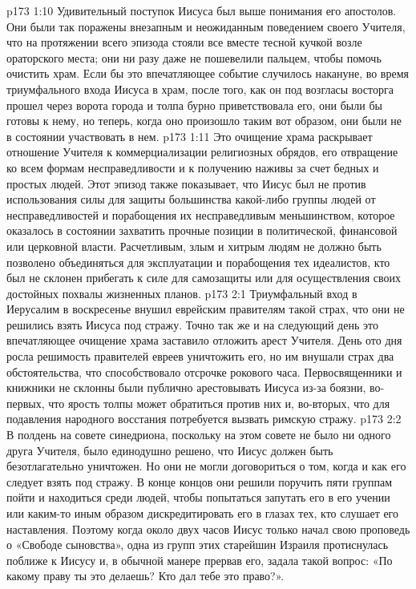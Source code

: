 \vs p173 1:10 Удивительный поступок Иисуса был выше понимания его апостолов. Они были так поражены внезапным и неожиданным поведением своего Учителя, что на протяжении всего эпизода стояли все вместе тесной кучкой возле ораторского места; они ни разу даже не пошевелили пальцем, чтобы помочь очистить храм. Если бы это впечатляющее событие случилось накануне, во время триумфального входа Иисуса в храм, после того, как он под возгласы восторга прошел через ворота города и толпа бурно приветствовала его, они были бы готовы к нему, но теперь, когда оно произошло таким вот образом, они были не в состоянии участвовать в нем.
\vs p173 1:11 Это очищение храма раскрывает отношение Учителя к коммерциализации религиозных обрядов, его отвращение ко всем формам несправедливости и к получению наживы за счет бедных и простых людей. Этот эпизод также показывает, что Иисус был не против использования силы для защиты большинства какой\hyp{}либо группы людей от несправедливостей и порабощения их несправедливым меньшинством, которое оказалось в состоянии захватить прочные позиции в политической, финансовой или церковной власти. Расчетливым, злым и хитрым людям не должно быть позволено объединяться для эксплуатации и порабощения тех идеалистов, кто был не склонен прибегать к силе для самозащиты или для осуществления своих достойных похвалы жизненных планов.
\vs p173 2:1 Триумфальный вход в Иерусалим в воскресенье внушил еврейским правителям такой страх, что они не решились взять Иисуса под стражу. Точно так же и на следующий день это впечатляющее очищение храма заставило отложить арест Учителя. День ото дня росла решимость правителей евреев уничтожить его, но им внушали страх два обстоятельства, что способствовало отсрочке рокового часа. Первосвященники и книжники не склонны были публично арестовывать Иисуса из\hyp{}за боязни, во\hyp{}первых, что ярость толпы может обратиться против них и, во\hyp{}вторых, что для подавления народного восстания потребуется вызвать римскую стражу.
\vs p173 2:2 В полдень на совете синедриона, поскольку на этом совете не было ни одного друга Учителя, было единодушно решено, что Иисус должен быть безотлагательно уничтожен. Но они не могли договориться о том, когда и как его следует взять под стражу. В конце концов они решили поручить пяти группам пойти и находиться среди людей, чтобы попытаться запутать его в его учении или каким\hyp{}то иным образом дискредитировать его в глазах тех, кто слушает его наставления. Поэтому когда около двух часов Иисус только начал свою проповедь о «Свободе сыновства», одна из групп этих старейшин Израиля протиснулась поближе к Иисусу и, в обычной манере прервав его, задала такой вопрос: «По какому праву ты это делаешь? Кто дал тебе это право?».
